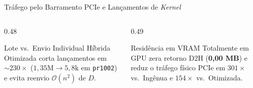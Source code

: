 \begin{frame}{Tráfego pelo Barramento PCIe e Lançamentos de \emph{Kernel}}
  \vspace{0.06cm}
  \begin{columns}[T,onlytextwidth]
    \begin{column}{0.48\textwidth}
      \begin{block}{Lote vs.\ Envio Individual}
        Híbrida Otimizada corta lançamentos em \textbf{$\sim 230\times$} ($1{,}35\text{M} \to 5{,}8\text{k}$ em \texttt{pr1002}) e evita reenvio $\mathcal{O}(n^2)$ de $D$.
      \end{block}
    \end{column}
    \begin{column}{0.49\textwidth}
      \begin{exampleblock}{Residência em VRAM}
        Totalmente em GPU zera retorno D2H (\textbf{0,00 MB}) e reduz o tráfego físico PCIe em \textbf{$301\times$} vs.\ Ingênua e \textbf{$154\times$} vs.\ Otimizada.
      \end{exampleblock}
    \end{column}
  \end{columns}
\end{frame}

